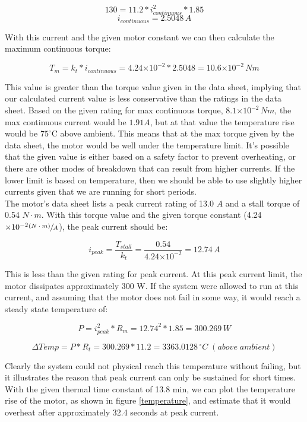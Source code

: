 \documentclass{article}
\theoremstyle{plain}
\theoremstyle{definition}
\theoremstyle{remark}
\providecommand{\e}[1]{\ensuremath{\times 10^{#1}}}
\begin{document}
$$130 = 11.2*i_{continuous}^2*1.85$$
$$i_{continuous} = 2.5048 \,A$$

With this current and the given motor constant we can then calculate the maximum continuous torque:

$$T_{m} = k_{t}*i_{continuous} = 4.24\e{-2}*2.5048 = 10.6\e{-2}\, Nm$$

This value is greater than the torque value given in the data sheet, implying that our calculated current value is less conservative than the ratings in the data sheet. Based on the given rating for max continuous torque, $8.1 \e{-2}\, Nm$, the max continuous current would be $1.91 A$, but at that value the temperature rise would be $75^\circ$C above ambient. This means that at the max torque given by the data sheet, the motor would be well under the temperature limit. It's possible that the given value is either based on a safety factor to prevent overheating, or there are other modes of breakdown that can result from higher currents. If the lower limit is based on temperature, then we should be able to use slightly higher currents given that we are running for short periods.\\

The motor's data sheet lists a peak current rating of 13.0 $A$ and a stall torque of 0.54 $N \cdot m$. With this torque value and the given torque constant (4.24$\e{-2} \sfrac{(N \cdot m)}{A}$), the peak current should be:


$$i_{peak} = \frac{T_{stall}}{k_{t}} = \frac{0.54}{4.24\e{-2}} = 12.74 \,A$$

This is less than the given rating for peak current. At this peak current limit, the motor dissipates approximately 300 W.  If the system were allowed to run at this current, and assuming that the motor does not fail in some way, it would reach a steady state temperature of:

$$P = i_{peak}^2 * R_{m} = 12.74^2 * 1.85 = 300.269 \,W$$

$$\Delta Temp = P * R_{t} = 300.269 * 11.2 = 3363.0128  \,{^\circ}C\;(above \;ambient)$$ 

Clearly the system could not physical reach this temperature without failing, but it illustrates the reason that peak current can only be sustained for short times. With the given thermal time constant of 13.8 min, we can plot the temperature rise of the motor, as shown in figure \ref{temperature}, and estimate that it would overheat after approximately 32.4 seconds at peak current. 
\end{document}
